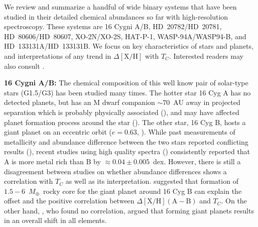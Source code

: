 \documentclass[modern, letterpaper]{aastex61}
\newcommand*\elem[1]{\ensuremath{\mathrm{#1}}}
\newcommand*\elemH[1]{\ensuremath{[\mathrm{#1}/\elem{H}]}}
\newcommand{\Tcondens}{\ensuremath{T_C}}
\newcommand{\mearth}{\ensuremath{M_\oplus}}
\begin{document}
We review and summarize a handful of
wide binary systems that have been studied in their detailed chemical
abundances so far with high-resolution spectroscopy.
These systems are
  16 Cygni A/B,
  HD~20782/HD~20781,
  HD~80606/HD~80607,
  XO-2N/XO-2S,
  HAT-P-1,
  WASP-94A/WASP94-B, and
  HD~133131A/HD~133131B.
We focus on key characteristics of stars and planets, and interpretations of
any trend in $\Delta\elemH{X}$ with \Tcondens.
Interested readers may also consult \citealt{2016arXiv161104064M}.

{\bf 16 Cygni A/B:}
The chemical composition of this well know pair of solar-type stars (G1.5/G3)
has been studied many times.
The hotter star 16 Cyg A has no detected planets, but has an M dwarf companion
$\sim 70$~AU away in projected separation which is probably physically
associated (\citealt{2002ApJ...581..654P}), and may have affected planet
formation process around the star
(\citealt{1996ApJ...458..312J,2005MNRAS.363..641M}).
The other star, 16 Cyg B, hosts a giant planet on an eccentric orbit ($e=0.63$,
\citealt{1997ApJ...483..457C}).
While past measurements of metallicity and abundance difference between the two
stars reported conflicting results
(\citealt{2001ApJ...553..405L,2011ApJ...737L..32S}), recent studies using high
quality spectra (\citealt{2011ApJ...740...76R,2014ApJ...790L..25T})
consistently reported that A is more metal rich than B by $\approx 0.04 \pm
0.005$~dex.
However, there is still a disagreement between studies on
whether abundance differences shows a correlation with $\Tcondens$ as well as
its interpretation.
\citealt{2014ApJ...790L..25T} suggested that formation of $1.5-6$~\mearth\
rocky core for the giant planet around 16 Cyg B can explain the offset and the
positive correlation between $\Delta\elemH{X} (\mathrm{A}-\mathrm{B})$
and \Tcondens. On the other hand, \citealt{2011ApJ...740...76R},
who found no correlation, argued that forming giant planets
results in an overall shift in all elements.
\end{document}
